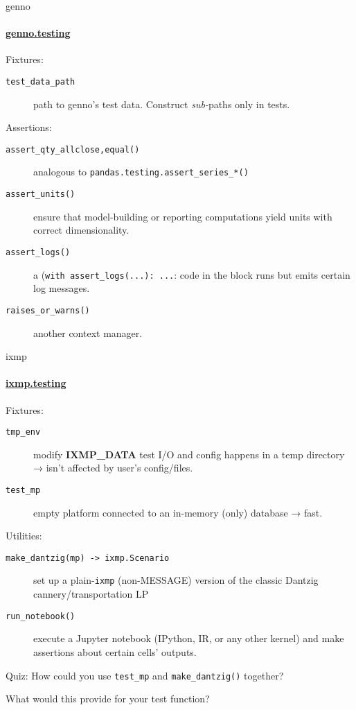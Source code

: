 \documentclass[12pt,aspectratio=169]{beamer}
\renewcommand{\mod}[1]{\texttt{#1}}
\newcommand{\func}[1]{\texttt{#1()}}
\newcommand{\py}[1]{\texttt{#1}}
\begin{document}
\begin{frame}{\ttfamily genno}
\framesubtitle{\href{https://genno.readthedocs.io/en/latest/api.html\#module-genno.testing}{\ttfamily genno.testing}}

Fixtures:
\begin{description}
  \item [\py{test_data_path}] path to genno's test data. Construct \emph{sub-}paths only in tests.
\end{description}

\medskip
Assertions:
\begin{description}
  \item [\func{assert_qty_{allclose,equal}}] analogous to \func{pandas.testing.assert_series_*}
  \item [\func{assert_units}] ensure that model-building or reporting computations yield units with correct dimensionality.
  \item [\func{assert_logs}] a (\py{with assert_logs(...): ...}: code in the block runs but emits certain log messages.
  \item [\func{raises_or_warns}] another context manager.
\end{description}

\end{frame}

\begin{frame}{\ttfamily ixmp}
\framesubtitle{
\href{https://docs.messageix.org/projects/ixmp/en/stable/api.html\#module-ixmp.testing}{\ttfamily ixmp.testing}}

Fixtures:
\begin{description}
  \item [\py{tmp_env}] modify \textbf{IXMP\_DATA} test I/O and config happens in a temp directory → isn't affected by user's config/files.
  \item [\py{test_mp}] empty platform connected to an in-memory (only) database → fast.
\end{description}

\medskip
Utilities:
\begin{description}
  \item [\py{make_dantzig(mp) -> ixmp.Scenario}] set up a plain-\mod{ixmp} (non-MESSAGE) version of the classic Dantzig cannery/transportation LP
  \item [\func{run_notebook}] execute a Jupyter notebook (IPython, IR, or any other kernel) and make assertions about certain cells' outputs.
\end{description}

\medskip
Quiz: How could you use \mod{test_mp} and \func{make_dantzig} together?

\hspace{12mm} What would this provide for your test function?
\end{frame}
\end{document}
